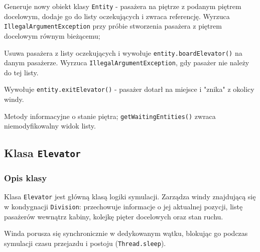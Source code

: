 \documentclass[12pt, a4paper]{article}
\begin{document}
\begin{description}[leftmargin=1cm, style=nextline]
  \item[\texttt{spawnEntity(int destinationFloor)}]
    Generuje nowy obiekt klasy \texttt{Entity} - pasażera na piętrze z podanym piętrem docelowym, dodaje go do listy oczekujących i zwraca referencję.
    Wyrzuca \texttt{IllegalArgumentException} przy próbie stworzenia pasażera z piętrem docelowym równym bieżącemu;

  \item[\texttt{entityEntersElevator(Entity entity)}]
    Usuwa pasażera z listy oczekujących i wywołuje \texttt{entity.boardElevator()} na danym pasażerze. 
    Wyrzuca \texttt{IllegalArgumentException}, gdy pasażer nie należy do tej listy.

  \item[\texttt{entityExitsElevator(Entity entity)}]
    Wywołuje \texttt{entity.exitElevator()} - pasażer dotarł na miejsce i "znika" z okolicy windy.

  \item[\texttt{hasWaitingEntities()}, \texttt{getWaitingCount()}, \texttt{getWaitingEntities()}]
    Metody informacyjne o stanie piętra; \texttt{getWaitingEntities()} zwraca niemodyfikowalny widok listy.
\end{description}






\subsection{Klasa \texttt{Elevator}}
\label{subsec:elevator}

\subsubsection{Opis klasy}

Klasa \texttt{Elevator} jest główną klasą logiki symulacji. Zarządza windy znajdującą się w kondygnacji \texttt{Division}: przechowuje informacje o jej aktualnej pozycji, 
listę pasażerów wewnątrz kabiny, kolejkę pięter docelowych oraz stan ruchu. 

Winda porusza się synchronicznie w dedykowanym wątku, blokując go podczas symulacji czasu przejazdu i postoju (\texttt{Thread.sleep}).
\end{document}
